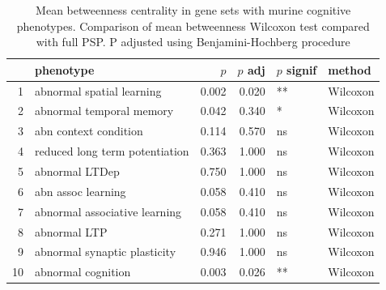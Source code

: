 \begin{table}[ht]
\centering
\begin{tabular}{rlrrll}
  \toprule
 & phenotype & $p$ & $p$ adj & $p$ signif & method \\ 
  \midrule
1 & abnormal spatial learning & 0.002 & 0.020 & ** & Wilcoxon \\ 
  2 & abnormal temporal memory & 0.042 & 0.340 & * & Wilcoxon \\ 
  3 & abn context condition & 0.114 & 0.570 & ns & Wilcoxon \\ 
  4 & reduced long term potentiation & 0.363 & 1.000 & ns & Wilcoxon \\ 
  5 & abnormal LTDep & 0.750 & 1.000 & ns & Wilcoxon \\ 
  6 & abn assoc learning & 0.058 & 0.410 & ns & Wilcoxon \\ 
  7 & abnormal associative learning & 0.058 & 0.410 & ns & Wilcoxon \\ 
  8 & abnormal LTP & 0.271 & 1.000 & ns & Wilcoxon \\ 
  9 & abnormal synaptic plasticity & 0.946 & 1.000 & ns & Wilcoxon \\ 
  10 & abnormal cognition & 0.003 & 0.026 & ** & Wilcoxon \\ 
   \bottomrule
\end{tabular}
\caption{Mean betweenness centrality in gene sets with murine cognitive phenotypes. Comparison of mean betweenness Wilcoxon test compared with full PSP. P adjusted using Benjamini-Hochberg procedure} 
\label{tab:betweenness murine phenotypes. Wilcoxon test compared with full PSP. P adjusted using B.H}
\end{table}


